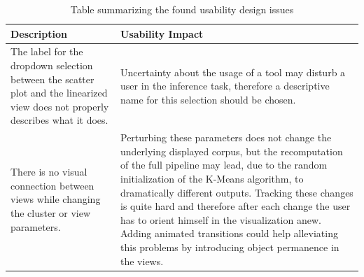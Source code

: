 \begin{table}
	\begin{tabular}[l]{| p{} | p{}  |} 
		\hline
		Description & Usability Impact \\ \hline \hline
		The label for the dropdown selection between the scatter plot and the linearized view does not properly describes what it does. & 
		Uncertainty about the usage of a tool may disturb a user in the inference task, therefore a descriptive name for this selection should be chosen. \\ \hline
		There is no visual connection between views while changing the cluster or view parameters. &
		Perturbing these parameters does not change the underlying displayed corpus, but the recomputation of the full pipeline may lead, due to the random initialization of the K-Means algorithm, to dramatically different outputs. Tracking these changes is quite hard and therefore after each change the user has to orient himself in the visualization anew. Adding animated transitions could help alleviating this problems by introducing object permanence in the views. \\ \hline	
	\end{tabular}
	\caption{\label{tab:usability_problems} Table summarizing the found usability design issues} 
\end{table}

